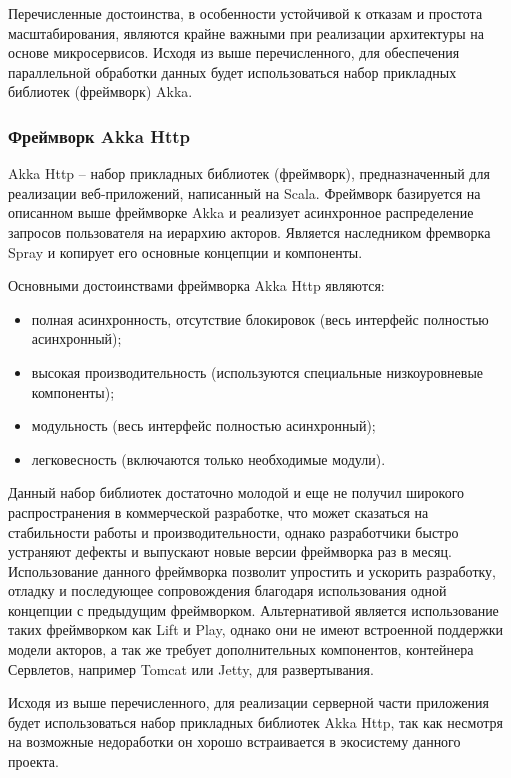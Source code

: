 Перечисленные достоинства, в особенности устойчивой к отказам и простота масштабирования, являются крайне важными при реализации архитектуры на основе микросервисов. Исходя из выше перечисленного, для обеспечения параллельной обработки данных будет использоваться набор прикладных библиотек (фреймворк) Akka.

\subsubsection{Фреймворк Akka Http}
\label{sec:techs:spray}

Akka Http – набор прикладных библиотек (фреймворк), предназначенный для реализации веб-приложений, написанный на Scala. Фреймворк базируется на описанном выше фреймворке Akka и реализует асинхронное распределение запросов пользователя на иерархию акторов. Является наследником фремворка Spray и копирует его основные концепции и компоненты.

Основными достоинствами фреймворка Akka Http являются:
\begin{itemize}
  \item полная асинхронность, отсутствие блокировок (весь интерфейс полностью асинхронный);
  \item высокая производительность (используются специальные низкоуровневые компоненты);
  \item модульность (весь интерфейс полностью асинхронный);
  \item легковесность (включаются только необходимые модули).
\end{itemize}

Данный набор библиотек достаточно молодой и еще не получил широкого распространения в коммерческой разработке, что может сказаться на стабильности работы и производительности, однако разработчики быстро устраняют дефекты и выпускают новые версии фреймворка раз в месяц. Использование данного фреймворка позволит упростить и ускорить разработку, отладку и последующее сопровождения благодаря использования одной концепции с предыдущим фреймворком.
Альтернативой является использование таких фреймворком как Lift и Play, однако они не имеют встроенной поддержки модели акторов, а так же требует дополнительных компонентов, контейнера Сервлетов, например Tomcat или Jetty, для развертывания.

Исходя из выше перечисленного, для реализации серверной части приложения будет использоваться набор прикладных библиотек Akka Http, так как несмотря на возможные недоработки он хорошо встраивается в экосистему данного проекта.

